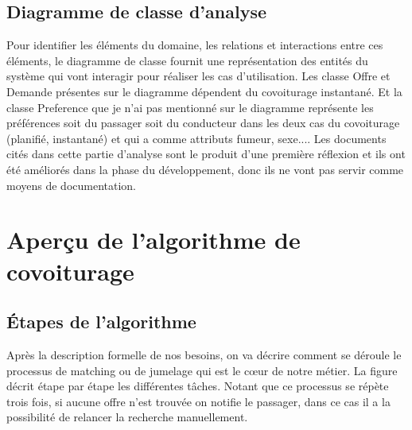 \subsection{Diagramme de classe d'analyse} %
Pour identifier les éléments du domaine, les relations et interactions entre ces éléments, le diagramme de classe fournit une représentation des entités du système qui vont interagir pour réaliser les cas d'utilisation.\newline
Les classe Offre et Demande présentes sur le diagramme dépendent du covoiturage instantané. Et la classe Preference que je n'ai pas mentionné sur le diagramme représente les préférences soit du passager soit du conducteur dans les deux cas du covoiturage (planifié, instantané) et qui a comme attributs fumeur, sexe....\newline
Les documents cités dans cette partie d'analyse sont le produit d'une première réflexion et ils ont été améliorés dans la phase du développement, donc ils ne vont pas servir comme moyens de documentation.

\section{Aperçu de l'algorithme de covoiturage} %
\label{sec:Aperçu de l'algorithme de covoiturage}
\subsection{Étapes de l'algorithme} %
Après la description formelle de nos besoins, on va décrire comment se déroule le processus de matching ou de jumelage qui est le cœur de notre métier.
\newline
La figure  décrit étape par étape les différentes tâches. Notant que ce processus se répète trois fois, si aucune offre n'est trouvée on notifie le passager, dans ce cas il a la possibilité de relancer la recherche manuellement.

